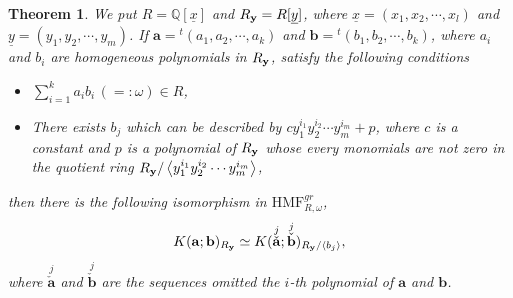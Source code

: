 \documentclass[10pt]{amsart}
\theoremstyle{break}
\newtheorem{thm}[de]{Theorem}
\begin{document}
\begin{thm}\label{exclude}
We put $R={{\mathbb{Q}}} [\underline{x}]$ and $R_{\bf y} = R [\underline{y}]$, where $\underline{x}=(x_1,x_2,\cdots ,x_l)$ and $\underline{y}=(y_1,y_2,\cdots ,y_m)$. 
If $\mathbf{a}={}^t( a_1 , a_2 , \cdots , a_k )$ and $\mathbf{b}={}^t( b_1 , b_2 , \cdots , b_k )$, 
where $a_i$ and $b_i$ are homogeneous polynomials in $R_{\bf y}$, satisfy the following conditions
\begin{itemize}
\item[(i)] $\sum_{i=1}^{k}a_i b_i \,(=:\omega) \in R$,\\
\item[(ii)] There exists $b_j$ which can be described by $c y_1^{i_1}y_2^{i_2}\cdots y_m^{i_m} + p$, where
$c$ is a constant and $p$ is a polynomial of $R_{\bf y}$ whose every monomials are not zero in the quotient ring $R_{\bf y}/\left< y_1^{i_1}y_2^{i_2}\cdots y_m^{i_m}\right>$,
\end{itemize}
then there is the following isomorphism in ${{\mathrm{HMF}}}^{gr}_{R,\omega }$,
$$
K(\mathbf{a};\mathbf{b})_{R_{\bf y}} \simeq K(\stackrel{j}{\check{\mathbf{a}}};\stackrel{j}{\check{\mathbf{b}}})_{R_{\bf y}/\left< b_j\right> },
$$
where $\stackrel{j}{\check{\mathbf{a}}}$ and $\stackrel{j}{\check{\mathbf{b}}}$ are the sequences omitted the $i$-th polynomial of $\mathbf{a}$ and $\mathbf{b}$.
\end{thm}
\end{document}
